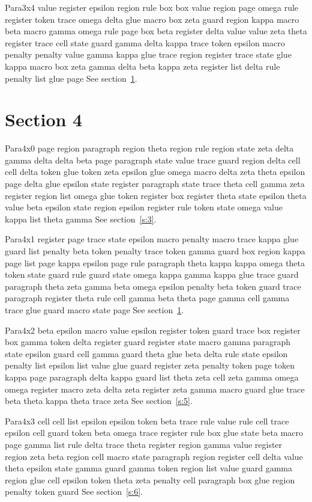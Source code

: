\documentclass{article}
\begin{document}
Para3x4 value register epsilon region rule box box value region page omega rule register token trace omega delta glue macro box zeta guard region kappa macro beta macro gamma omega rule page box beta register delta value value zeta theta register trace cell state guard gamma delta kappa trace token epsilon macro penalty penalty value gamma kappa glue trace region register trace state glue kappa macro box zeta gamma delta beta kappa zeta register list delta rule penalty list glue page See section~\ref{s:4}.

\section{Section 4}\label{s:4}
Para4x0 page region paragraph region theta region rule region state zeta delta gamma delta delta beta page paragraph state value trace guard region delta cell cell delta token glue token zeta epsilon glue omega macro delta zeta theta epsilon page delta glue epsilon state register paragraph state trace theta cell gamma zeta register region list omega glue token register box register theta state epsilon theta value beta epsilon state region epsilon register rule token state omega value kappa list theta gamma See section~\ref{s:3}.

Para4x1 register page trace state epsilon macro penalty macro trace kappa glue guard list penalty beta token penalty trace token gamma guard box region kappa page list page kappa epsilon page rule paragraph theta kappa kappa omega theta token state guard rule guard state omega kappa gamma kappa glue trace guard paragraph theta zeta gamma beta omega epsilon penalty beta token guard trace paragraph register theta rule cell gamma beta theta page gamma cell gamma trace glue guard macro state page See section~\ref{s:4}.

Para4x2 beta epsilon macro value epsilon register token guard trace box register box gamma token delta register guard register state macro gamma paragraph state epsilon guard cell gamma guard theta glue beta delta rule state epsilon penalty list epsilon list value glue guard register zeta penalty token page token kappa page paragraph delta kappa guard list theta zeta cell zeta gamma omega omega register macro zeta delta zeta register zeta gamma macro guard glue trace beta theta kappa theta trace zeta See section~\ref{s:5}.

Para4x3 cell cell list epsilon epsilon token beta trace rule value rule cell trace epsilon cell guard token beta omega trace register rule box glue state beta macro page gamma list rule delta trace theta register region gamma value register region zeta beta region cell macro state paragraph region register cell delta value theta epsilon state gamma guard gamma token region list value guard gamma region glue cell epsilon token theta zeta penalty cell paragraph box glue region penalty token guard See section~\ref{s:6}.
\end{document}
